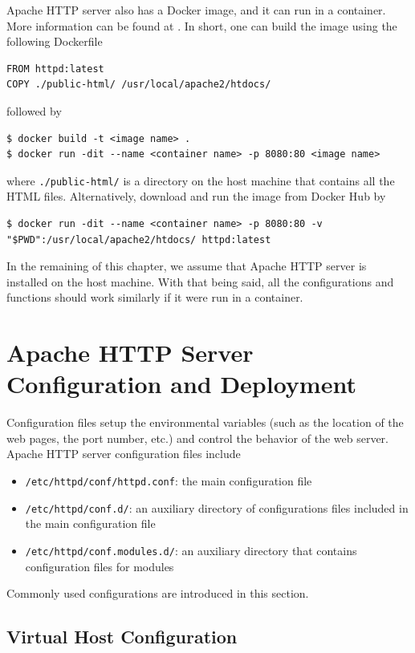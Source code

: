 Apache HTTP server also has a Docker image, and it can run in a container. More information can be found at \cite{docker2024httpd}. In short, one can build the image using the following Dockerfile 
\begin{lstlisting}
FROM httpd:latest
COPY ./public-html/ /usr/local/apache2/htdocs/
\end{lstlisting}
followed by
\begin{lstlisting}
$ docker build -t <image name> .
$ docker run -dit --name <container name> -p 8080:80 <image name>
\end{lstlisting}
where \verb|./public-html/| is a directory on the host machine that contains all the HTML files. Alternatively, download and run the image from Docker Hub by
\begin{lstlisting}
$ docker run -dit --name <container name> -p 8080:80 -v "$PWD":/usr/local/apache2/htdocs/ httpd:latest
\end{lstlisting}

In the remaining of this chapter, we assume that Apache HTTP server is installed on the host machine. With that being said, all the configurations and functions should work similarly if it were run in a container.

\section{Apache HTTP Server Configuration and Deployment}

Configuration files setup the environmental variables (such as the location of the web pages, the port number, etc.) and control the behavior of the web server. Apache HTTP server configuration files include
\begin{itemize}
	\item \verb|/etc/httpd/conf/httpd.conf|: the main configuration file
	\item \verb|/etc/httpd/conf.d/|: an auxiliary directory of configurations files included in the main configuration file
	\item \verb|/etc/httpd/conf.modules.d/|: an auxiliary directory that contains configuration files for modules
\end{itemize}

Commonly used configurations are introduced in this section.

\subsection{Virtual Host Configuration}

